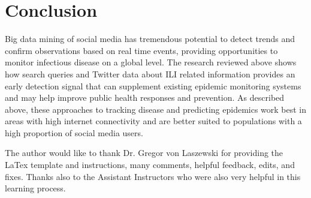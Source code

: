 \documentclass[sigconf]{acmart}
\begin{document}
\section{Conclusion}

Big data mining of social media has tremendous potential to detect trends and confirm 
observations based on real time events, providing opportunities to monitor infectious 
disease on a global level. The research reviewed above shows how search queries and 
Twitter data about ILI related information provides an early detection signal that can
supplement existing epidemic monitoring systems and may help improve public health 
responses and prevention. As described above, these approaches to tracking disease and
predicting epidemics work best in areas with high internet connectivity and are better 
suited to populations with a high proportion of social media users.

\begin{acks}

  The author would like to thank Dr. Gregor von Laszewski for providing the LaTex template
  and instructions, many comments, helpful feedback, edits, and fixes. Thanks also 
  to the Assistant Instructors who were also very helpful in this learning process. 

\end{acks}


 
\end{document}
